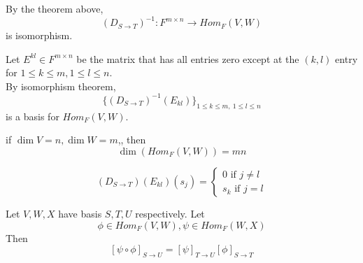 \begin{remark}
    By the theorem above, 
    \[
        \left( D_{S \to T} \right)^{-1} : F^{m \times n} \to Hom_F(V, W)
    \]
    is isomorphism.
\end{remark}

\begin{remark}
    Let $E^{kl} \in F^{m \times n}$ be the matrix that has all entries zero except at the $(k, l)$ entry for $1 \leq k \leq m, 1 \leq l \leq n$.  \\

    By isomorphism theorem, 
    \[
        \{ (D_{S \to T})^{-1} (E_{kl}) \}_{1 \leq k \leq m,\ 1 \leq l \leq n}
    \]
    is a basis for $Hom_F(V, W)$.
\end{remark}

\begin{corollary}
    if $\dim V = n, \dim W = m$,, then 
    \[
        \dim \left( Hom_F(V, W) \right) = mn
    \]
\end{corollary}
\begin{remark}
    \[
    \left( D_{S \to T} \right) (E_{kl}) (s_j) = \begin{cases}
        0 \text{ if } j \neq l \\
        s_k \text{ if } j = l
    \end{cases}
    \]
\end{remark}

\begin{theorem}
    Let $V, W, X$ have basis $S, T, U$ respectively. Let 
    \[
        \phi \in Hom_F(V, W), \psi \in Hom_F(W, X)
    \]
    Then 
    \[
        \left[ \psi \circ \phi \right]_{S \to U} = \left[ \psi \right]_{T \to U} \left[ \phi \right]_{S \to T}
    \]
\end{theorem}

